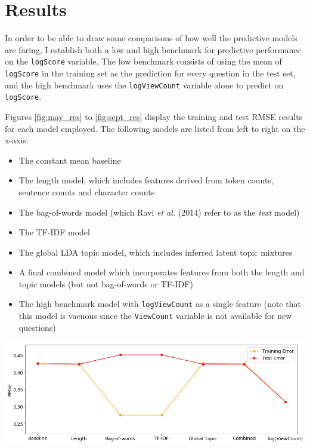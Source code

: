 \documentclass[11pt,preprint, authoryear]{article}
\let\origfigure\figure
\let\endorigfigure\endfigure
\renewenvironment{figure}[1][2] {
    \expandafter\origfigure\expandafter[H]
} {
    \endorigfigure
}
\begin{document}
\newpage

\section{\texorpdfstring{Results
\label{Results}}{Results }}\label{results}

In order to be able to draw some comparisons of how well the predictive
models are faring, I establish both a low and high benchmark for
predictive performance on the \texttt{logScore} variable. The low
benchmark consists of using the mean of \texttt{logScore} in the
training set as the prediction for every question in the test set, and
the high benchmark uses the \texttt{logViewCount} variable alone to
predict on \texttt{logScore}.

Figures \ref{fig:may_res} to \ref{fig:sept_res} display the training and
test RMSE results for each model employed. The following models are
listed from left to right on the x-axis:


\begin{itemize}
\item
  The constant mean baseline
\item
  The length model, which includes features derived from token counts,
  sentence counts and character counts
\item
  The bag-of-words model (which Ravi \emph{et al.} (2014) refer to as
  the \emph{text} model)
\item
  The TF-IDF model
\item
  The global LDA topic model, which includes inferred latent topic
  mixtures
\item
  A final combined model which incorporates features from both the
  length and topic models (but not bag-of-words or TF-IDF)
\item
  The high benchmark model with \texttt{logViewCount} as a single
  feature (note that this model is vacuous since the \texttt{ViewCount}
  variable is not available for new questions)
\end{itemize}


\footnotesize

\begin{figure}
\caption{\textbf{Model Training and Test RMSEs for May 2009}}
\label{fig:may_res}

\includegraphics[width=1\linewidth]{../../01-python-code/00-workspace/01-eda/01-graphs/May-09-rmse-results} 
\end{figure}
\end{document}
